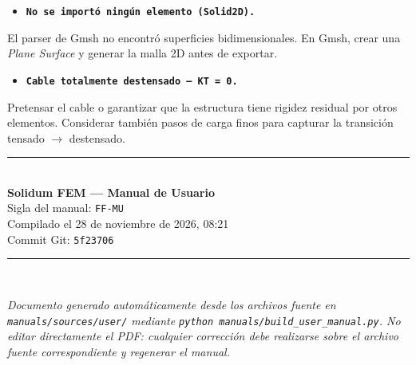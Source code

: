 \documentclass[11pt,oneside]{report}
\begin{document}
\begin{itemize}
  \item \textbf{\texttt{No se importó ningún elemento (Solid2D).\allowbreak{}}}
\end{itemize}
  El parser de Gmsh no encontró superficies bidimensionales. En Gmsh, crear una \textit{Plane Surface} y generar la malla 2D antes de exportar.

\begin{itemize}
  \item \textbf{\texttt{Cable totalmente destensado --- KT = 0.\allowbreak{}}}
\end{itemize}
  Pretensar el cable o garantizar que la estructura tiene rigidez residual por otros elementos. Considerar también pasos de carga finos para capturar la transición tensado \ensuremath{\to} destensado.


\newpage

\clearpage
\thispagestyle{empty}
\vspace*{\fill}
\begin{center}
\rule{0.4\textwidth}{0.4pt}\\[1em]
{\bfseries\color{yamlkey} Solidum FEM --- Manual de Usuario}\\[0.5em]
Sigla del manual: \texttt{FF-MU}\\[0.5em]
Compilado el 28 de noviembre de 2026, 08:21\\[0.5em]
Commit Git: \texttt{5f23706}\\[1em]
\rule{0.4\textwidth}{0.4pt}\\[2em]
\parbox{0.75\textwidth}{\small\itshape\centering
Documento generado automáticamente desde los archivos fuente en \texttt{manuals/sources/user/} mediante \texttt{python manuals/build\_user\_manual.py}. No editar directamente el PDF: cualquier corrección debe realizarse sobre el archivo fuente correspondiente y regenerar el manual.}
\end{center}
\vspace*{\fill}
\end{document}
